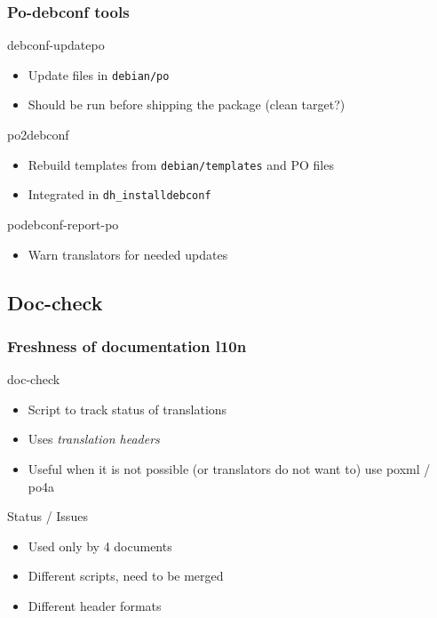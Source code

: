 \documentclass{beamer}
\begin{document}
\begin{frame}
  \frametitle{Po-debconf tools}
	\begin{block}
		{debconf-updatepo}
		\begin{itemize}
		\item
			{Update files in \texttt{debian/po}}
		\item
			Should be run before shipping the package (clean target?)
		\end{itemize}
	\end{block}
	\begin{block}
		{po2debconf}
		\begin{itemize}
		\item
			Rebuild templates from \texttt{debian/templates} and PO files
		\item
			Integrated in \texttt{dh\_installdebconf}
		\end{itemize}
	\end{block}
	\begin{block}
		{podebconf-report-po}
		\begin{itemize}
		\item
			Warn translators for needed updates
		\end{itemize}
	\end{block}
\end{frame}


\subsection{Doc-check}

\begin{frame}
  \frametitle{Freshness of documentation l10n}
	\begin{block}
		{doc-check}
		\begin{itemize}
		\item Script to track status of translations
		\item Uses {\em translation headers}
		\item Useful when it is not possible (or translators do not want to) use poxml / po4a
		\end{itemize}
	\end{block}
	\begin{block}
		{Status / Issues}
		\begin{itemize}
		\item Used only by 4 documents
		\item Different scripts, need to be merged
		\item Different header formats
		\end{itemize}
	\end{block}
\end{frame}
\end{document}
